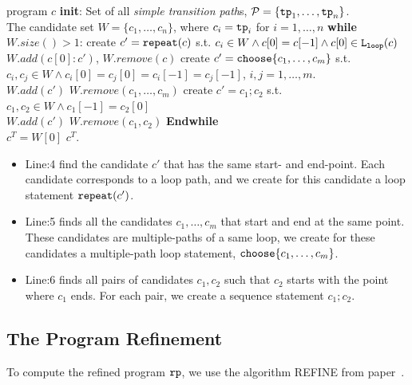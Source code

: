 \begin{algorithm}
 \caption{Program Rewriting Algorithm. $\kw{Rewrite}(c)$}
 \label{alg:alg-refine_rewrite}
 \begin{algorithmic}[1]
 \REQUIRE program $c$
 \STATE \textbf{init}: 
 Set of all \emph{simple transition path}s, 
 $\mathcal{P} = \{ \mathtt{tp}_1, \ldots, \mathtt{tp}_n \}$.
 \\
 The candidate set $W = \{c_1, \ldots, c_n\}$, where $c_i = \mathtt{tp}_i$ for $i = 1, \ldots, n$
 \STATE \textbf{while} $W.size()> 1$:
 \STATE
 \quad create $c' = \mathtt{repeat}(c)$ s.t. $c_i \in W \land c[0] = c[-1] \land c[0] \in \mathtt{L}_{\mathtt{loop}}(c)$
 \\ \quad $W.add(c[0]: c')$, \qquad $W.remove(c)$
 \STATE \quad create $c' = \rpchoose{c_1, \ldots, c_m}$ 
 s.t. $c_i, c_j \in W \land c_i[0] = c_j[0] = c_i[-1] = c_j[-1]$, $i, j = 1, \ldots, m$.
 \\ \quad $W.add(c')$ \qquad $W.remove(c_1, \ldots, c_m)$
 \STATE \quad create $c' = c_1; c_2$ s.t. $c_1, c_2 \in W \land c_1[-1] = c_2[0]$
 \\
 \quad $W.add(c')$ \qquad $W.remove(c_1, c_2)$
 \STATE \textbf{Endwhile}
 \\ $c^T = W[0]$
 \RETURN $c^T$.
\end{algorithmic}
\end{algorithm}
%
\begin{itemize}
\item
Line:4 find the candidate $c'$ that has the same start- and end-point.
Each candidate corresponds to a loop path, and we create for this candidate a loop statement
$\mathtt{repeat}(c')$.

\item
 Line:5 
 finds all the candidates $c_1, \ldots, c_m$ that start and end at the same point.
 These candidates are multiple-paths of a same loop, 
 we create for these candidates a multiple-path loop statement,  $\rpchoose{c_1, \ldots, c_m}$.
\item
Line:6 finds all pairs of candidates $c_1, c_2$ such that  $c_2$ starts with the point where $c_1$ ends.
For each pair, we create a sequence statement
 $c_1; c_2$.
\end{itemize}

\subsection{The Program Refinement}
To compute the refined program $\mathtt{rp}$,
we use the algorithm REFINE from paper~\cite{GulwaniJK09}. 


